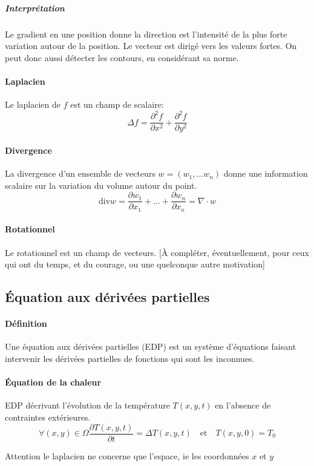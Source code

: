 \documentclass[french]{article}
\begin{document}
\subparagraph{Interprétation} Le gradient en une position donne la direction
est l'intensité de la plus forte variation autour de la position. Le
vecteur est dirigé vers les valeurs fortes. On peut donc aussi détecter
les contours, en considérant sa norme.

\paragraph{Laplacien} Le laplacien de $f$ est un champ de scalaire:
$$\Delta f = \frac{\partial^2 f}{\partial x^2} + \frac{\partial^2 f}{\partial y^2}$$

\paragraph{Divergence} La divergence d'un ensemble de vecteurs
$w = (w_1, \dots w_n)$ donne une information scalaire sur la variation
du volume autour du point.
$$\text{div} w = \frac{\partial w_1}{\partial x_1} + \dots + \frac{\partial w_n}{\partial x_n} = \nabla \cdot w$$

\paragraph{Rotationnel} 
Le rotationnel est un champ de vecteurs.
[À compléter, éventuellement,
pour ceux qui ont du temps, et du courage, ou une quelconque autre motivation]

\subsection{Équation aux dérivées partielles}
\paragraph{Définition} Une équation aux dérivées partielles (EDP) est un
système d'équations faisant intervenir les dérivées partielles de fonctions
qui sont les inconnues.

\paragraph{Équation de la chaleur} EDP décrivant l'évolution de la
température $T(x,y,t)$ en l'absence de contraintes extérieures.
$$\forall (x,y) \in \Omega \frac{\partial T(x,y,t)}{\partial t} = \Delta T(x,y,t)
\quad\text{et}\quad T(x,y,0) = T_0$$

Attention le laplacien ne concerne que l'espace, ie les coordonnées $x$ et $y$
\end{document}
